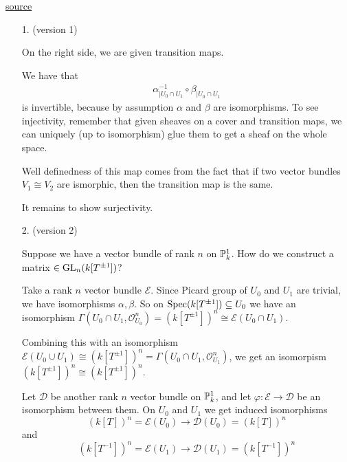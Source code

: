 \newcommand{\sheet}{9}




\maketitle{}

\begin{exercise}{2}
    \href{http://math.uchicago.edu/~may/REU2021/REUPapers/Davidovsky.pdf}{source}
    \begin{enumerate}
        \item[1. (version 1)]{
                On the right side, we are given transition maps. 
        
                We have that
                \begin{align*}
                    \alpha_{| U_0\cap U_1}^{-1} \circ \beta_{| U_0\cap U_1}
                \end{align*}
                is invertible, because by assumption $\alpha$ and $\beta$ are
                isomorphisms. To see injectivity, remember that given sheaves on
                a cover and transition maps, we can uniquely (up to isomorphism)
                glue them to get a sheaf on the whole space.

                Well definedness of this map comes from the fact that if two vector bundles 
                $V_1\cong V_2$ are ismorphic, then the transition map is the same.

                It remains to show surjectivity.
            }
        \item[2. (version 2)]{
            Suppose we have a vector bundle of rank $n$ on $\mathbb{P}^1_k$. How do
            we construct a matrix $\in \operatorname{GL}_n(k[T^{\pm 1}])$?

            Take a rank $n$ vector bundle $\mathcal{E}$. Since Picard group of
            $U_0$ and $U_1$ are trivial, we have isomorphisms $\alpha, \beta$.
            So on $\operatorname{Spec}(k[T^{\pm 1}]) \subseteq U_0$ we have an isomorphism
            $\Gamma(U_0 \cap U_1, \mathcal{O}^n_{U_0}) = (k[T^{\pm 1}])^n \cong
            \mathcal{E}(U_0 \cap U_1)$.

            Combining this with an isomorphism $\mathcal{E}(U_0 \cup U_1) \cong
            (k[T^{\pm 1}])^n = \Gamma(U_0 \cap U_1, \mathcal{O}^n_{U_1})$, we
            get an isomorpism $(k[T^{\pm 1}])^n \cong (k[T^{\pm 1}])^n$.

            Let $\mathcal{D}$ be another rank $n$ vector bundle on $\mathbb{P}^1_k$,
            and let $\varphi \colon \mathcal{E} \to \mathcal{D}$ be an
            isomorphism between them.
            On $U_0$ and $U_1$ we get induced isomorphisms
            \begin{equation*}
                (k[T])^n = \mathcal{E}(U_0) \to \mathcal{D}(U_0) = (k[T])^n
            \end{equation*}
            and
            \begin{equation*}
                (k[T^{-1}])^n = \mathcal{E}(U_1) \to \mathcal{D}(U_1) = (k[T^{-1}])^n
            \end{equation*}
        }
        

\end{enumerate}
\end{exercise}
